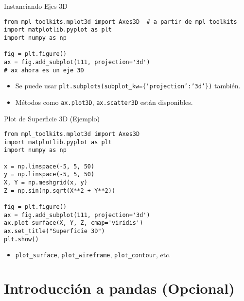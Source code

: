 \documentclass[10pt]{beamer}
\begin{document}
\begin{frame}[fragile]{Instanciando Ejes 3D}
\begin{verbatim}
from mpl_toolkits.mplot3d import Axes3D  # a partir de mpl_toolkits
import matplotlib.pyplot as plt
import numpy as np

fig = plt.figure()
ax = fig.add_subplot(111, projection='3d')
# ax ahora es un eje 3D
\end{verbatim}
\begin{itemize}
  \item Se puede usar \texttt{plt.subplots(subplot\_kw=\{'projection':'3d'\})} también.
  \item Métodos como \texttt{ax.plot3D}, \texttt{ax.scatter3D} están disponibles.
\end{itemize}
\end{frame}

\begin{frame}[fragile]{Plot de Superficie 3D (Ejemplo)}
\begin{verbatim}
from mpl_toolkits.mplot3d import Axes3D
import matplotlib.pyplot as plt
import numpy as np

x = np.linspace(-5, 5, 50)
y = np.linspace(-5, 5, 50)
X, Y = np.meshgrid(x, y)
Z = np.sin(np.sqrt(X**2 + Y**2))

fig = plt.figure()
ax = fig.add_subplot(111, projection='3d')
ax.plot_surface(X, Y, Z, cmap='viridis')
ax.set_title("Superficie 3D")
plt.show()
\end{verbatim}
\begin{itemize}
  \item \texttt{plot\_surface}, \texttt{plot\_wireframe}, \texttt{plot\_contour}, etc.
\end{itemize}
\end{frame}

\section{Introducción a pandas (Opcional)}
\end{document}
